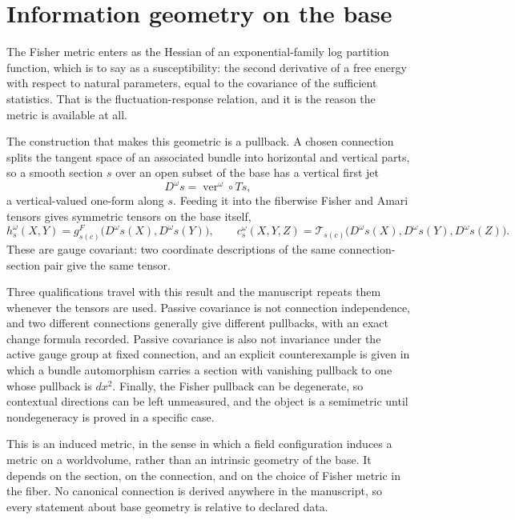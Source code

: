 \documentclass[11pt,letterpaper]{article}
\begin{document}
\section{Information geometry on the base}

The Fisher metric enters as the Hessian of an exponential-family log partition function, which is to say as a susceptibility: the second derivative of a free energy with respect to natural parameters, equal to the covariance of the sufficient statistics. That is the fluctuation-response relation, and it is the reason the metric is available at all.

The construction that makes this geometric is a pullback. A chosen connection splits the tangent space of an associated bundle into horizontal and vertical parts, so a smooth section \(s\) over an open subset of the base has a vertical first jet
\begin{equation}
  D^\omega s=\operatorname{ver}^\omega\circ Ts,
  \label{eq:covariant-jet}
\end{equation}
a vertical-valued one-form along \(s\). Feeding it into the fiberwise Fisher and Amari tensors gives symmetric tensors on the base itself,
\begin{equation}
  h_s^\omega(X,Y)=g^F_{s(c)}\bigl(D^\omega s(X),D^\omega s(Y)\bigr),
  \qquad
  c_s^\omega(X,Y,Z)=\mathcal T_{s(c)}\bigl(D^\omega s(X),D^\omega s(Y),D^\omega s(Z)\bigr).
  \label{eq:pullbacks}
\end{equation}
These are gauge covariant: two coordinate descriptions of the same connection-section pair give the same tensor.

Three qualifications travel with this result and the manuscript repeats them whenever the tensors are used. Passive covariance is not connection independence, and two different connections generally give different pullbacks, with an exact change formula recorded. Passive covariance is also not invariance under the active gauge group at fixed connection, and an explicit counterexample is given in which a bundle automorphism carries a section with vanishing pullback to one whose pullback is \(dx^2\). Finally, the Fisher pullback can be degenerate, so contextual directions can be left unmeasured, and the object is a semimetric until nondegeneracy is proved in a specific case.

\begin{translationbox}
This is an induced metric, in the sense in which a field configuration induces a metric on a worldvolume, rather than an intrinsic geometry of the base. It depends on the section, on the connection, and on the choice of Fisher metric in the fiber. No canonical connection is derived anywhere in the manuscript, so every statement about base geometry is relative to declared data.
\end{translationbox}
\end{document}
